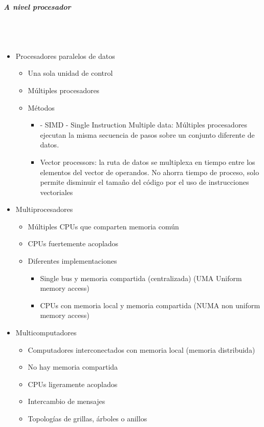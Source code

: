 \subparagraph{A nivel procesador}\mbox{}\\\\%
\begin{itemize}
\item Procesadores paralelos de datos
	\begin{itemize}
	\item Una sola unidad de control
	\item Múltiples procesadores
	\item Métodos
		\begin{itemize}
		\item - SIMD - Single Instruction Multiple data: Múltiples procesadores ejecutan la misma secuencia de pasos sobre un conjunto diferente de datos.
		\item Vector processors: la ruta de datos se multiplexa en tiempo entre los elementos del vector de operandos. No ahorra tiempo de proceso, solo permite disminuir el tamaño del código por el uso de instrucciones vectoriales
		\end{itemize}
	\end{itemize}
\item Multiprocesadores
\begin{itemize}
	\item Múltiples CPUs que comparten memoria común
	\item CPUs fuertemente acoplados
	\item Diferentes implementaciones 
		\begin{itemize}
		\item Single bus y memoria compartida (centralizada) (UMA Uniform memory access)
		\item CPUs con memoria local y memoria compartida (NUMA non uniform memory access)
		\end{itemize}
\end{itemize}

\item Multicomputadores
\begin{itemize}
	\item Computadores interconectados con memoria local (memoria distribuida)
	\item No hay memoria compartida
	\item CPUs ligeramente acoplados
	\item Intercambio de mensajes
	\item Topologías de grillas, árboles o anillos
\end{itemize}

\end{itemize}

